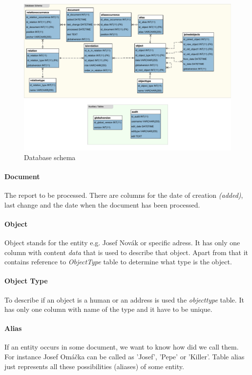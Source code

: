 \begin{figure}[!htb]
        \centering
        \includegraphics[width=\textwidth]{Images/DatabaseSchema}
        \caption{Database schema}
        \label{fig:DatabaseSchema}
\end{figure}



\paragraph{Document} The report to be processed. There are columns for the date of 
creation \emph{(added)}, last change and the date when the document has been processed.

\paragraph{Object} Object stands for the entity e.g. Josef Novák or specific adress. 
It has only one column with content \emph{data} that is used to describe that object. Apart from that it contains reference to \emph{ObjectType} table to determine what type is the object.

\paragraph{Object Type} To describe if an object is a human or an address is 
used the \emph{objecttype} table. It has only one column with name of the type and it have to be unique.

\paragraph{Alias} If an entity occurs in some document, we want to 
know how did we call them. For instance Josef Omáčka can be called as 'Josef', 
'Pepe' or 'Killer'. Table alias just represents all these possibilities (aliases) 
of some entity.

